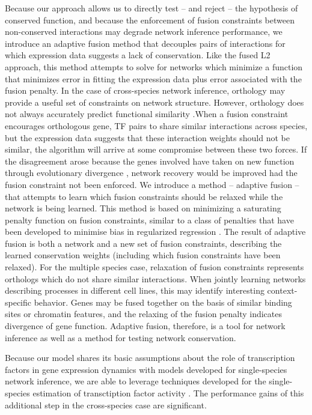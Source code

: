 \documentclass[11pt]{article}
\begin{document}
Because our approach allows us to directly test -- and reject -- the hypothesis of conserved function, and because the enforcement of fusion constraints between non-conserved interactions may degrade network inference performance, we introduce an adaptive fusion method that decouples pairs of interactions for which expression data suggests a lack of conservation. Like the fused L2 approach, this method attempts to solve for networks which minimize a function that minimizes error in fitting the expression data plus error associated with the fusion penalty. In the case of cross-species network inference, orthology may provide a useful set of constraints on network structure. However, orthology does not always accurately predict functional similarity \cite{gabaldon_functional_2013}.When a fusion constraint encourages orthologous gene, TF pairs to share similar interactions across species, but the expression data suggests that these interaction weights should not be similar, the algorithm will arrive at some compromise between these two forces. If the disagreement arose because the genes involved have taken on new function through evolutionary divergence \cite{kellis_proof_2004}, network recovery would be improved had the fusion constraint not been enforced. We introduce a method -- adaptive fusion -- that attempts to learn which fusion constraints should be relaxed while the network is being learned. This method is based on minimizing a saturating penalty function on fusion constraints, similar to a class of penalties that have been developed to minimise bias in regularized regression \cite{fan2001variable,zhang2010nearly}. The result of adaptive fusion is both a network and a new set of fusion constraints, describing the learned conservation weights (including which fusion constraints have been relaxed). For the multiple species case, relaxation of fusion constraints represents orthologs which do not share similar interactions. When jointly learning networks describing processes in different cell lines, this may identify interesting context-specific behavior. Genes may be fused together on the basis of similar binding sites or chromatin features, and the relaxing of the fusion penalty indicates divergence of gene function. Adaptive fusion, therefore, is a tool for network inference as well as a method for testing network conservation. 

Because our model shares its basic assumptions about the role of transcription factors in gene expression dynamics with models developed for single-species network inference, we are able to leverage techniques developed for the single-species estimation of transctiption factor activity \cite{fu_reconstructing_2011}. The performance gains of this additional step in the cross-species case are significant.
\end{document}
